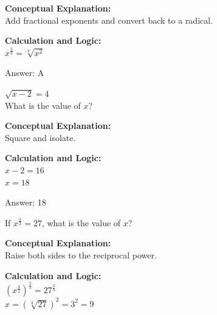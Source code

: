 \documentclass[11pt,paper=a4,answers]{exam}
\begin{document}
\begin{questions}
\begin{solution}
\textbf{Conceptual Explanation:} \\
Add fractional exponents and convert back to a radical.

\vspace{20pt}

\textbf{Calculation and Logic:} \\
$x^{\frac{2}{3}} = \sqrt[3]{x^2}$

\vspace{25pt}

Answer: \colorbox{yellow!100}{A}
\end{solution}

\vspace{40pt}

\question
$\sqrt{x-2} = 4$ \\
What is the value of $x$?

\begin{solution}
\textbf{Conceptual Explanation:} \\
Square and isolate.

\vspace{20pt}

\textbf{Calculation and Logic:} \\
$x-2 = 16$ \\
$x = 18$

\vspace{25pt}

Answer: \colorbox{yellow!100}{18}
\end{solution}

\vspace{40pt}

\question
If $x^{\frac{3}{2}} = 27$, what is the value of $x$?

\begin{solution}
\textbf{Conceptual Explanation:} \\
Raise both sides to the reciprocal power.

\vspace{20pt}

\textbf{Calculation and Logic:} \\
$(x^{\frac{3}{2}})^{\frac{2}{3}} = 27^{\frac{2}{3}}$ \\
$x = (\sqrt[3]{27})^2 = 3^2 = 9$

\vspace{25pt}


\end{solution}
\end{questions}
\end{document}
